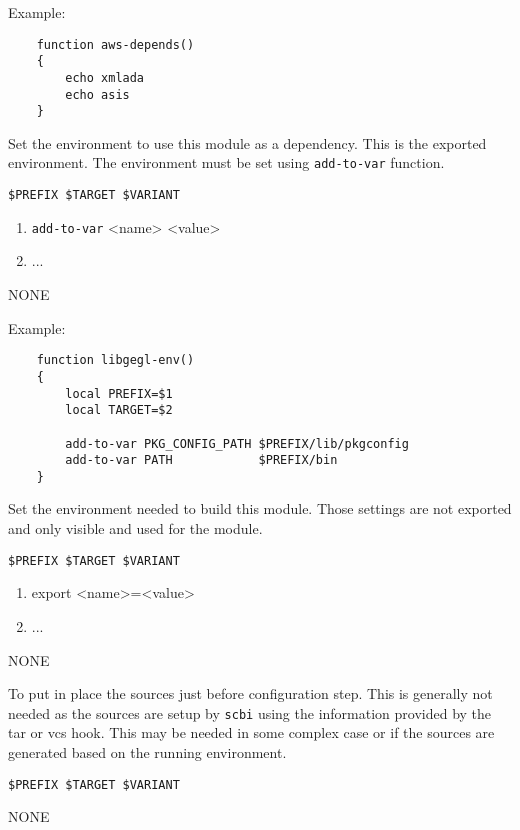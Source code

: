 \documentclass[a4paper,12pt,twoside]{article}
\newcommand{\code}[1]{\texttt{#1}}
\begin{document}
\begin{description}[font=\large\texttt]
	Example:
	\begin{lstlisting}
	function aws-depends()
	{
		echo xmlada
		echo asis
	}
	\end{lstlisting}

	\item[<module>-{[}common|<variant>{]}-env] Set the environment to use this module as a dependency. This is the exported environment. The environment must be set using \code{add-to-var} function.
	\begin{description}[font=\textit,style=standard]
		\item[parameter] \tabto{2cm} \code{\$PREFIX \$TARGET \$VARIANT}
		\begin{enumerate}
			\item \code{add-to-var} <name> <value>
			\item ...
		\end{enumerate}
		\item[return] \tabto{2cm} NONE
	\end{description}

	Example:
	\begin{lstlisting}
	function libgegl-env()
	{
		local PREFIX=$1
		local TARGET=$2

		add-to-var PKG_CONFIG_PATH $PREFIX/lib/pkgconfig
		add-to-var PATH            $PREFIX/bin
	}
	\end{lstlisting}

	\item[<module>-{[}common|<variant>{]}-build-env] Set the environment needed to build this module.
	Those settings are not exported and only visible and used for the module.
	\begin{description}[font=\textit,style=standard]
		\item[parameter] \tabto{2cm} \code{\$PREFIX \$TARGET \$VARIANT}
		\begin{enumerate}
			\item export <name>=<value>
			\item ...
		\end{enumerate}
		\item[return] \tabto{2cm} NONE
	\end{description}

	\item[<module>-setup] To put in place the sources just before configuration step. This is generally not needed as the sources are setup by \code{scbi} using the information provided by the tar or vcs hook. This may be needed in some complex case or if the sources are generated based on the running environment.
	\begin{description}[font=\textit,style=standard]
		\item[parameter] \tabto{2cm} \code{\$PREFIX \$TARGET \$VARIANT}
		\item[return] \tabto{2cm} NONE
	\end{description}


\end{description}
\end{document}
